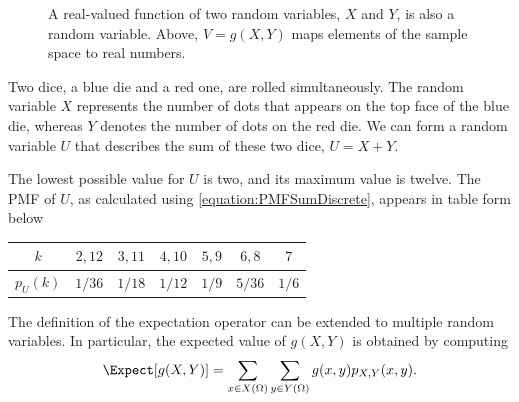 \begin{figure}[ht]
\begin{center}
\begin{footnotesize}
\end{footnotesize}
\caption{A real-valued function of two random variables, $X$ and $Y$, is also a random variable.
Above, $V = g(X, Y)$ maps elements of the sample space to real numbers.}
\end{center}
\end{figure}

\begin{example} \label{example:SumDice1}
Two dice, a blue die and a red one, are rolled simultaneously.
The random variable $X$ represents the number of dots that appears on the top face of the blue die, whereas $Y$ denotes the number of dots on the red die.
We can form a random variable $U$ that describes the sum of these two dice, $U = X + Y$.

The lowest possible value for $U$ is two, and its maximum value is twelve.
The PMF of $U$, as calculated using \eqref{equation:PMFSumDiscrete}, appears in table form below
\begin{center}
\begin{tabular}{|c|c|c|c|c|c|c|}
\hline
$k$ & $2, 12$ & $3, 11$ & $4, 10$ & $5, 9$ & $6, 8$ & $7$ \\
\hline
$p_U (k)$ & $1/36$ & $1/18$ & $1/12$ & $1/9$ & $5/36$ & $1/6$ \\
\hline
\end{tabular}
\end{center}
\end{example}

The definition of the expectation operator can be extended to multiple random variables.
In particular, the expected value of $g(X,Y)$ is obtained by computing
\begin{equation} \label{equation:ExpectationMultipleRV}
\Expect [g(X,Y)] = \sum_{x \in X(\Omega)} \sum_{y \in Y(\Omega)} g(x,y) p_{X,Y} (x,y) .
\end{equation}

